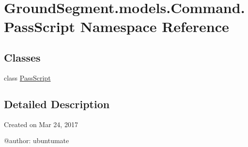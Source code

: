 \hypertarget{namespace_ground_segment_1_1models_1_1_command_1_1_pass_script}{}\section{Ground\+Segment.\+models.\+Command.\+Pass\+Script Namespace Reference}
\label{namespace_ground_segment_1_1models_1_1_command_1_1_pass_script}
\subsection*{Classes}
\begin{DoxyCompactItemize}
\item 
class \hyperlink{class_ground_segment_1_1models_1_1_command_1_1_pass_script_1_1_pass_script}{Pass\+Script}
\end{DoxyCompactItemize}


\subsection{Detailed Description}
\begin{DoxyVerb}Created on Mar 24, 2017

@author: ubuntumate
\end{DoxyVerb}
 